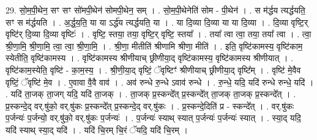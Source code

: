 \documentclass[17pt]{extarticle}
\begin{document}
29. सो॒म॒पी॒थेन॒ सꣳ सꣳ सो॑मपी॒थेन॑ सोमपी॒थेन॒ सम् । . सो॒म॒पी॒थेनेति॑ सोम - पी॒थेन॑ । . स म॑र्द्धय त्यर्द्धयति॒ सꣳ स म॑र्द्धयति । . अ॒र्द्ध॒य॒ति॒ या या ऽर्द्ध॑य त्यर्द्धयति॒ या । . या दि॒व्या दि॒व्या या या दि॒व्या । . दि॒व्या वृष्टि॒र् वृष्टि॑र् दि॒व्या दि॒व्या वृष्टिः॑ । . वृष्टि॒ स्तया॒ तया॒ वृष्टि॒र् वृष्टि॒ स्तया᳚ । . तया᳚ त्वा त्वा॒ तया॒ तया᳚ त्वा । . त्वा॒ श्री॒णा॒मि॒ श्री॒णा॒मि॒ त्वा॒ त्वा॒ श्री॒णा॒मि॒ । . श्री॒णा॒ मीतीति॑ श्रीणामि श्रीणा॒ मीति॑ । . इति॒ वृष्टि॑कामस्य॒ वृष्टि॑काम॒ स्येतीति॒ वृष्टि॑कामस्य । . वृष्टि॑कामस्य श्रीणीयाच् छ्रीणीया॒द् वृष्टि॑कामस्य॒ वृष्टि॑कामस्य श्रीणीयात् । . वृष्टि॑काम॒स्येति॒ वृष्टि॑ - का॒म॒स्य॒ । . श्री॒णी॒या॒द् वृष्टिं॒ ॅवृष्टिꣳ॑ श्रीणीयाच् छ्रीणीया॒द् वृष्टि᳚म् । . वृष्टि॑ मे॒वैव वृष्टिं॒ ॅवृष्टि॑ मे॒व । . ए॒वावा वै॒वै वाव॑ । . अव॑ रुन्धे रु॒न्धे ऽवाव॑ रुन्धे । . रु॒न्धे॒ यदि॒ यदि॑ रुन्धे रुन्धे॒ यदि॑ । . यदि॑ ता॒जक् ता॒जग् यदि॒ यदि॑ ता॒जक् । . ता॒जक् प्र॒स्कन्दे᳚त् प्र॒स्कन्दे᳚त् ता॒जक् ता॒जक् प्र॒स्कन्दे᳚त् । . प्र॒स्कन्दे॒द् वर्.षु॑को॒ वर्.षु॑कः प्र॒स्कन्दे᳚त् प्र॒स्कन्दे॒द् वर्.षु॑कः । . प्र॒स्कन्दे॒दिति॑ प्र - स्कन्दे᳚त् । . वर्.षु॑कः प॒र्जन्यः॑ प॒र्जन्यो॒ वर्.षु॑को॒ वर्.षु॑कः प॒र्जन्यः॑ । . प॒र्जन्यः॑ स्याथ् स्यात् प॒र्जन्यः॑ प॒र्जन्यः॑ स्यात् । . स्या॒द् यदि॒ यदि॑ स्याथ् स्या॒द् यदि॑ । . यदि॑ चि॒रम् चि॒रं ॅयदि॒ यदि॑ चि॒रम् । \newline
\end{document}
